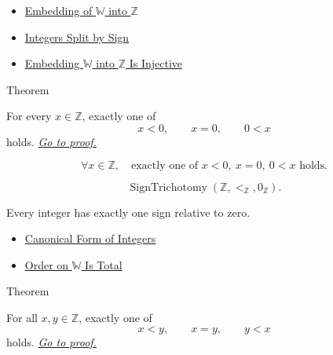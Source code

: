 \begin{dependencies}
\begin{itemize}
  \item \hyperref[def:canonical-embedding-w-into-z]{Embedding of $\mathbb{W}$ into $\mathbb{Z}$}
  \item \hyperref[cor:integers-split-by-sign]{Integers Split by Sign}
  \item \hyperref[thm:embedding-w-into-z-injective]{Embedding $\mathbb{W}$ into $\mathbb{Z}$ Is Injective}
\end{itemize}
\end{dependencies}

\begin{theorembox}{Theorem}
\begin{theorem}
\label{thm:sign-trichotomy-on-z}
For every $x\in\mathbb{Z}$, exactly one of
\[
x<0,\qquad x=0,\qquad 0<x
\]
holds.
\hyperref[prf:sign-trichotomy-on-z]{\textit{Go to proof.}}
\end{theorem}
\end{theorembox}

\begin{remark*}
\[
\forall x\in\mathbb{Z},\quad
\text{exactly one of }x<0,\ x=0,\ 0<x\text{ holds}.
\]
\end{remark*}

\begin{remark*}
\[
\operatorname{SignTrichotomy}(\mathbb{Z},<_{\mathbb{Z}},0_{\mathbb{Z}}).
\]
\end{remark*}

\begin{remark*}[Interpretation]
Every integer has exactly one sign relative to zero.
\end{remark*}

\begin{dependencies}
\begin{itemize}
  \item \hyperref[thm:canonical-form-of-integers]{Canonical Form of Integers}
  \item \hyperref[thm:order-on-w-total]{Order on $\mathbb{W}$ Is Total}
\end{itemize}
\end{dependencies}

\begin{theorembox}{Theorem}
\begin{theorem}
\label{thm:trichotomy-on-z}
For all $x,y\in\mathbb{Z}$, exactly one of
\[
x<y,\qquad x=y,\qquad y<x
\]
holds.
\hyperref[prf:trichotomy-on-z]{\textit{Go to proof.}}
\end{theorem}
\end{theorembox}

